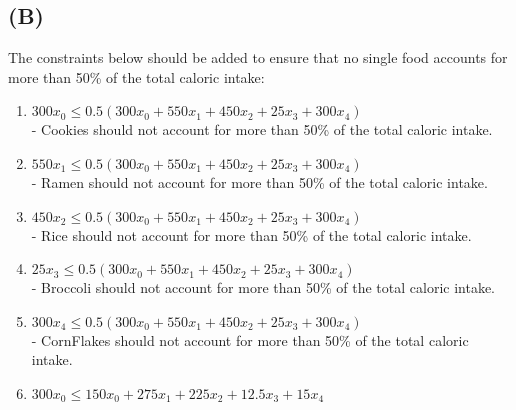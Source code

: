 \documentclass[12pt]{article}
\begin{document}
\subsection*{(B)}
The constraints below should be added to ensure that no single food accounts for more than 50\% of the total caloric intake:
\begin{enumerate}
\itemsep0em
  \item $300x_{0} \leq 0.5(300x_{0} + 550x_{1} + 450x_{2} + 25x_{3} + 300x_{4})$\\
  - Cookies should not account for more than 50\% of the total caloric intake. 
  \item $550x_{1} \leq 0.5(300x_{0} + 550x_{1} + 450x_{2} + 25x_{3} + 300x_{4})$\\
  - Ramen should not account for more than 50\% of the total caloric intake. 
  \item $450x_{2} \leq 0.5(300x_{0} + 550x_{1} + 450x_{2} + 25x_{3} + 300x_{4})$\\
  - Rice should not account for more than 50\% of the total caloric intake. 
  \item $25x_{3} \leq 0.5(300x_{0} + 550x_{1} + 450x_{2} + 25x_{3} + 300x_{4})$\\
  - Broccoli should not account for more than 50\% of the total caloric intake. 
  \item $300x_{4} \leq 0.5(300x_{0} + 550x_{1} + 450x_{2} + 25x_{3} + 300x_{4})$\\
  - CornFlakes should not account for more than 50\% of the total caloric intake.
  \item $300x_{0} \leq 150x_{0} + 275x_{1} + 225x_{2} + 12.5x_{3} + 15x_{4}$ 
\end{enumerate}


\newpage




\end{document}
